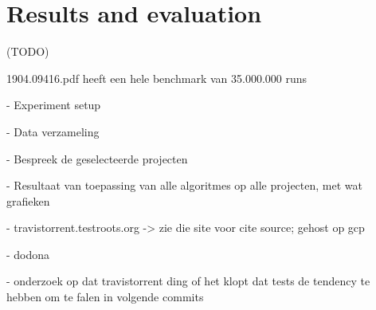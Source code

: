 \chapter{Results and evaluation}
(TODO)

1904.09416.pdf heeft een hele benchmark van 35.000.000 runs

- Experiment setup

  -  Data verzameling

  - Bespreek de geselecteerde projecten
  
- Resultaat van toepassing van alle algoritmes op alle projecten, met wat grafieken

- travistorrent.testroots.org -> zie die site voor cite source; gehost op gcp

- dodona

- onderzoek op dat travistorrent ding of het klopt dat tests de tendency te hebben om te falen in volgende commits
